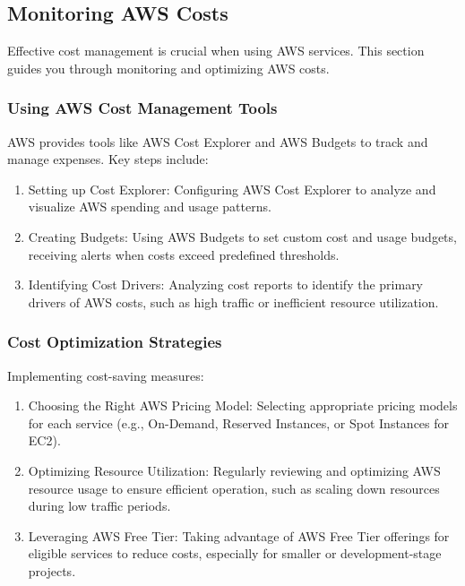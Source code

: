 \documentclass{book}
\begin{document}
\subsection{Monitoring AWS Costs}
Effective cost management is crucial when using AWS services. This section guides you through monitoring and optimizing AWS costs.

\subsubsection{Using AWS Cost Management Tools}
AWS provides tools like AWS Cost Explorer and AWS Budgets to track and manage expenses. Key steps include:
\begin{enumerate}
    \item Setting up Cost Explorer: Configuring AWS Cost Explorer to analyze and visualize AWS spending and usage patterns.
    \item Creating Budgets: Using AWS Budgets to set custom cost and usage budgets, receiving alerts when costs exceed predefined thresholds.
    \item Identifying Cost Drivers: Analyzing cost reports to identify the primary drivers of AWS costs, such as high traffic or inefficient resource utilization.
\end{enumerate}

\subsubsection{Cost Optimization Strategies}
Implementing cost-saving measures:
\begin{enumerate}
    \item Choosing the Right AWS Pricing Model: Selecting appropriate pricing models for each service (e.g., On-Demand, Reserved Instances, or Spot Instances for EC2).
    \item Optimizing Resource Utilization: Regularly reviewing and optimizing AWS resource usage to ensure efficient operation, such as scaling down resources during low traffic periods.
    \item Leveraging AWS Free Tier: Taking advantage of AWS Free Tier offerings for eligible services to reduce costs, especially for smaller or development-stage projects.
\end{enumerate}
\end{document}
